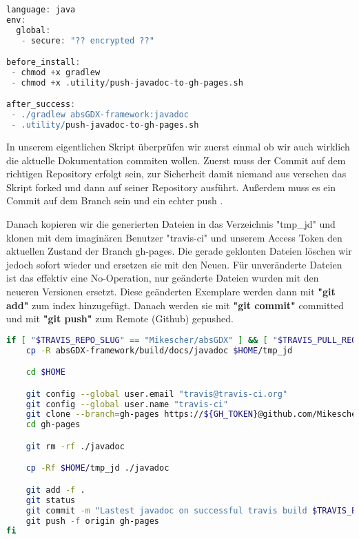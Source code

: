 \doinline %
\begin{lstlisting}[caption=TravisCI Konfiguration für das Erzeugen von JavaDoc, title=\hspace{0 pt}, language=groovy]
language: java
env:
  global:
   - secure: "?? encrypted ??"

before_install:
 - chmod +x gradlew
 - chmod +x .utility/push-javadoc-to-gh-pages.sh

after_success:
 - ./gradlew absGDX-framework:javadoc
 - .utility/push-javadoc-to-gh-pages.sh
\end{lstlisting}

In unserem eigentlichen Skript überprüfen wir zuerst einmal ob wir auch wirklich die aktuelle Dokumentation commiten wollen. Zuerst muss der Commit auf dem richtigen Repository erfolgt sein, zur Sicherheit damit niemand aus versehen das Skript forked und dann auf seiner Repository ausführt. Außerdem muss es ein Commit auf dem Branch  sein und ein echter push .

Danach kopieren wir die generierten Dateien in das Verzeichnis "tmp\_jd" und klonen mit dem imaginären Benutzer "travis-ci" und unserem Access Token den aktuellen Zustand der Branch gh-pages. 
Die gerade geklonten Dateien löschen wir jedoch sofort wieder und ersetzen sie mit den Neuen. 
Für unveränderte Dateien ist das effektiv eine No-Operation, nur geänderte Dateien wurden mit den neueren Versionen ersetzt. 
Diese geänderten Exemplare werden dann mit \textbf{"git add"} zum index hinzugefügt. 
Danach werden sie mit \textbf{"git commit"} committed und mit \textbf{"git push"} zum Remote (Github) gepushed.

\doinline
\begin{lstlisting}[caption=Das Javadoc Publish Bashscript, title=\hspace{0 pt}, language=bash]
if [ "$TRAVIS_REPO_SLUG" == "Mikescher/absGDX" ] && [ "$TRAVIS_PULL_REQUEST" == "false" ] && [ "$TRAVIS_BRANCH" == "master" ]; then
	cp -R absGDX-framework/build/docs/javadoc $HOME/tmp_jd

	cd $HOME

	git config --global user.email "travis@travis-ci.org"
	git config --global user.name "travis-ci"
	git clone --branch=gh-pages https://${GH_TOKEN}@github.com/Mikescher/absGDX gh-pages
	cd gh-pages

	git rm -rf ./javadoc

	cp -Rf $HOME/tmp_jd ./javadoc

	git add -f .
	git status
	git commit -m "Lastest javadoc on successful travis build $TRAVIS_BUILD_NUMBER auto-pushed to gh-pages"
	git push -f origin gh-pages
fi
\end{lstlisting}

